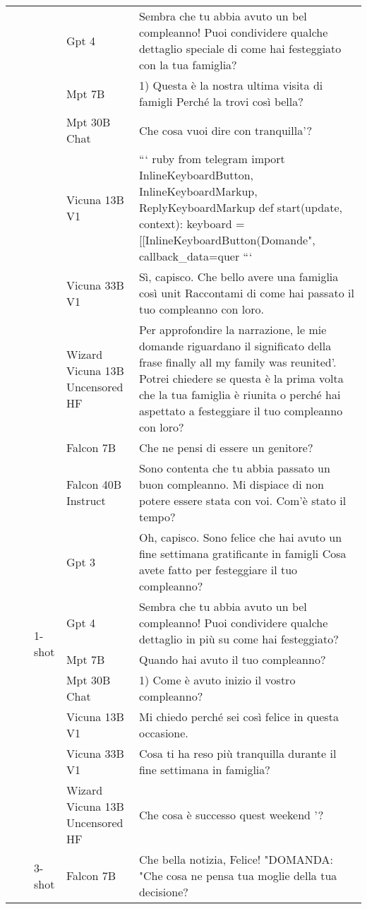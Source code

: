 \begin{center}
\begin{longtable}{l|l|l|p{3cm}|p{8cm}}
 &  &  & Gpt 4 & Sembra che tu abbia avuto un bel compleanno! Puoi condividere qualche dettaglio speciale di come hai festeggiato con la tua famiglia? \\
 &  &  & Mpt 7B & 1) Questa è la nostra ultima visita di famigli Perché la trovi così bella? \\
 &  &  & Mpt 30B Chat &  Che cosa vuoi dire con tranquilla'? \\
 &  &  & Vicuna 13B V1 & ``` ruby from telegram import InlineKeyboardButton, InlineKeyboardMarkup, ReplyKeyboardMarkup def start(update, context): keyboard = [[InlineKeyboardButton(Domande", callback_data=quer ``` \\
 &  &  & Vicuna 33B V1 & Sì, capisco. Che bello avere una famiglia così unit Raccontami di come hai passato il tuo compleanno con loro. \\
 &  &  & Wizard Vicuna 13B Uncensored HF & Per approfondire la narrazione, le mie domande riguardano il significato della frase finally all my family was reunited'. Potrei chiedere se questa è la prima volta che la tua famiglia è riunita o perché hai aspettato a festeggiare il tuo compleanno con loro? \\
\cline{3-5}
 &  & \multirow[c]{9}{*}{1-shot} & Falcon 7B & Che ne pensi di essere un genitore? \\
 &  &  & Falcon 40B Instruct & Sono contenta che tu abbia passato un buon compleanno. Mi dispiace di non potere essere stata con voi. Com'è stato il tempo? \\
 &  &  & Gpt 3 & Oh, capisco. Sono felice che hai avuto un fine settimana gratificante in famigli Cosa avete fatto per festeggiare il tuo compleanno? \\
 &  &  & Gpt 4 & Sembra che tu abbia avuto un bel compleanno! Puoi condividere qualche dettaglio in più su come hai festeggiato? \\
 &  &  & Mpt 7B & Quando hai avuto il tuo compleanno? \\
 &  &  & Mpt 30B Chat & 1) Come è avuto inizio il vostro compleanno? \\
 &  &  & Vicuna 13B V1 & Mi chiedo perché sei così felice in questa occasione. \\
 &  &  & Vicuna 33B V1 & Cosa ti ha reso più tranquilla durante il fine settimana in famiglia? \\
 &  &  & Wizard Vicuna 13B Uncensored HF & Che cosa è successo quest weekend '? \\
\cline{3-5}
 &  & \multirow[c]{8}{*}{3-shot} & Falcon 7B & Che bella notizia, Felice! "DOMANDA: "Che cosa ne pensa tua moglie della tua decisione? \\

\end{longtable}
\end{center}
